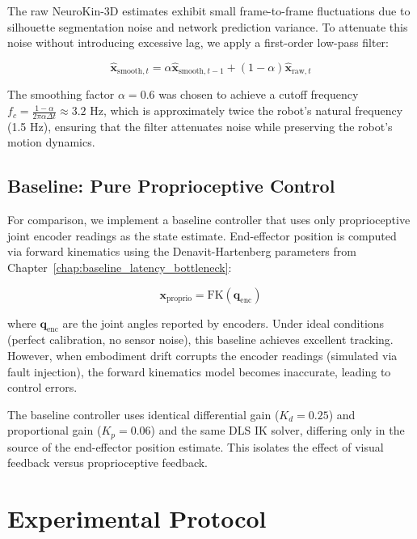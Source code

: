 \documentclass[12pt,a4paper,oneside]{report}
\begin{document}
The raw NeuroKin-3D estimates exhibit small frame-to-frame fluctuations due to silhouette segmentation noise and network prediction variance. To attenuate this noise without introducing excessive lag, we apply a first-order low-pass filter:

\begin{equation}
\hat{\mathbf{x}}_{\text{smooth},t} = \alpha \hat{\mathbf{x}}_{\text{smooth},t-1} + (1 - \alpha) \hat{\mathbf{x}}_{\text{raw},t}
\end{equation}

The smoothing factor $\alpha = 0.6$ was chosen to achieve a cutoff frequency $f_c = \frac{1-\alpha}{2\pi \alpha \Delta t} \approx 3.2$ Hz, which is approximately twice the robot's natural frequency (1.5 Hz), ensuring that the filter attenuates noise while preserving the robot's motion dynamics.

\subsection{Baseline: Pure Proprioceptive Control}
\label{subsec:baseline_pure_proprioceptive_control}

For comparison, we implement a baseline controller that uses only proprioceptive joint encoder readings as the state estimate. End-effector position is computed via forward kinematics using the Denavit-Hartenberg parameters from Chapter~\ref{chap:baseline_latency_bottleneck}:

\begin{equation}
\mathbf{x}_{\text{proprio}} = \text{FK}(\mathbf{q}_{\text{enc}})
\end{equation}

where $\mathbf{q}_{\text{enc}}$ are the joint angles reported by encoders. Under ideal conditions (perfect calibration, no sensor noise), this baseline achieves excellent tracking. However, when embodiment drift corrupts the encoder readings (simulated via fault injection), the forward kinematics model becomes inaccurate, leading to control errors.

The baseline controller uses identical differential gain ($K_d = 0.25$) and proportional gain ($K_p = 0.06$) and the same DLS IK solver, differing only in the source of the end-effector position estimate. This isolates the effect of visual feedback versus proprioceptive feedback.

\section{Experimental Protocol}
\end{document}

